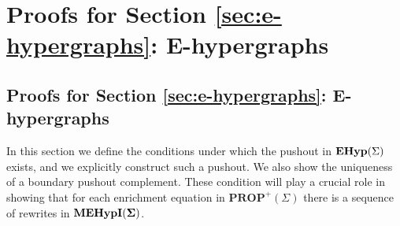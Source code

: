 \ifdefined\ONECOLUMN
\section{Proofs for Section \ref{sec:e-hypergraphs}: E-hypergraphs}
\else
\subsection{Proofs for Section \ref{sec:e-hypergraphs}: E-hypergraphs}
\fi
\label{sec:appendix:pushout}

In this section we define the conditions under which the pushout in $\mathbf{EHyp}(\Sigma)$ exists, and we explicitly construct such a pushout.
We also show the uniqueness of a boundary pushout complement.
These condition will play a crucial role in showing that for each enrichment equation in $\textbf{PROP}^{+}(\Sigma)$ there is a sequence of rewrites in ${\mathbf{MEHypI(\Sigma)}}$.

